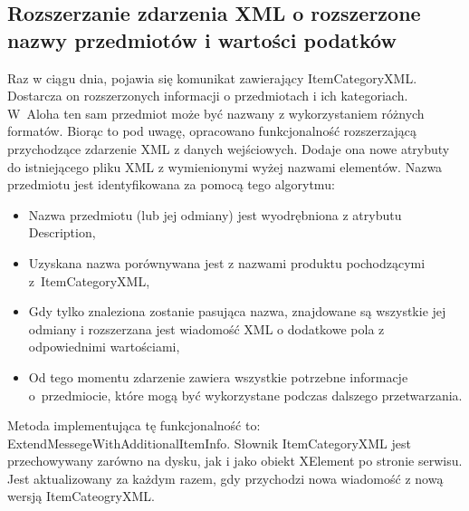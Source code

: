 \documentclass[a4paper]{book}
\begin{document}
\subsection{Rozszerzanie zdarzenia XML o rozszerzone nazwy przedmiotów i wartości podatków}
Raz w ciągu dnia, pojawia się komunikat zawierający ItemCategoryXML. Dostarcza on rozszerzonych informacji o przedmiotach i ich kategoriach. W~Aloha ten sam przedmiot może być nazwany z wykorzystaniem różnych formatów.
Biorąc to pod uwagę, opracowano funkcjonalność rozszerzającą przychodzące zdarzenie XML z danych wejściowych.
Dodaje ona nowe atrybuty do istniejącego pliku XML z wymienionymi wyżej nazwami elementów. Nazwa przedmiotu jest identyfikowana za pomocą tego algorytmu:
\begin{itemize}
	\item Nazwa przedmiotu (lub jej odmiany) jest wyodrębniona z atrybutu Description,
	\item Uzyskana nazwa porównywana jest z nazwami produktu pochodzącymi z~ItemCategoryXML,
	\item Gdy tylko znaleziona zostanie pasująca nazwa, znajdowane są wszystkie jej odmiany i rozszerzana jest wiadomość XML o dodatkowe pola z odpowiednimi wartościami,
	\item Od tego momentu zdarzenie zawiera wszystkie potrzebne informacje o~przedmiocie, które mogą być wykorzystane podczas dalszego przetwarzania.
\end{itemize}
Metoda implementująca tę funkcjonalność to: ExtendMessegeWithAdditionalItemInfo.
Słownik ItemCategoryXML jest przechowywany zarówno na dysku, jak i jako obiekt XElement po stronie serwisu. Jest aktualizowany za każdym razem, gdy przychodzi nowa wiadomość z nową wersją ItemCateogryXML.
\end{document}
